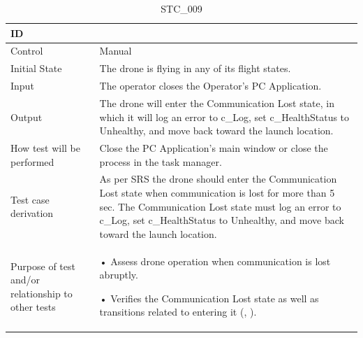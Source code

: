 \documentclass[12pt, titlepage]{article}
\begin{document}
\begin{table}[!h]
\begin{center}
\caption {STC\_009}
\label{tab:STC_009}
\begin{tabular}{ | m{3.2cm} | m{12.2cm} | } 
\hline
ID & \nameref{tab:STC_009} \\ 
\hline
Control & Manual \\ 
\hline
Initial State & The drone is flying in any of its flight states. \\ 
\hline
Input & The operator closes the Operator's PC Application. \\ 
\hline
Output & The drone will enter the Communication Lost state, in which it will log an error to c_Log, set c_HealthStatus to Unhealthy, and move back toward the launch location. \\ 
\hline
How test will be performed & Close the PC Application's main window or close the process in the task manager. \\ 
\hline
Test case derivation & As per SRS the drone should enter the Communication Lost state when communication is lost for more than 5 sec. The Communication Lost state must log an error to c_Log, set c_HealthStatus to Unhealthy, and move back toward the launch location. \\ 
\hline
Purpose of test and/or relationship to other tests &  • Assess drone operation when communication is lost abruptly.

• Verifies the Communication Lost state as well as transitions related to entering it (\nameref{STA_010}, \nameref{TRANS_010}).  
\\ 
\hline
\end{tabular}
\end{center}
\end{table}
\end{document}
